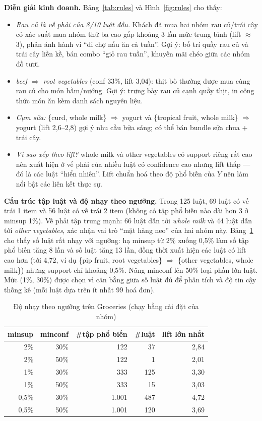 \documentclass[10pt,twocolumn,letterpaper]{article}
\begin{document}
\textbf{Diễn giải kinh doanh.} Bảng~\ref{tab:rules} và Hình~\ref{fig:rules} cho thấy:
\begin{itemize}
\item \emph{Rau củ là vế phải của 8/10 luật đầu.} Khách đã mua hai nhóm rau củ/trái cây có xác suất mua nhóm thứ ba cao gấp khoảng 3 lần mức trung bình (lift $\approx$ 3), phản ánh hành vi ``đi chợ nấu ăn cả tuần''. Gợi ý: bố trí quầy rau củ và trái cây liền kề, bán combo ``giỏ rau tuần'', khuyến mãi chéo giữa các nhóm đồ tươi.
\item \emph{beef $\Rightarrow$ root vegetables} (conf 33\%, lift 3,04): thịt bò thường được mua cùng rau củ cho món hầm/nướng. Gợi ý: trưng bày rau củ cạnh quầy thịt, in công thức món ăn kèm danh sách nguyên liệu.
\item \emph{Cụm sữa:} \{curd, whole milk\} $\Rightarrow$ yogurt và \{tropical fruit, whole milk\} $\Rightarrow$ yogurt (lift 2,6–2,8) gợi ý nhu cầu bữa sáng; có thể bán bundle sữa chua + trái cây.
\item \emph{Vì sao xếp theo lift?} whole milk và other vegetables có support riêng rất cao nên xuất hiện ở vế phải của nhiều luật có confidence cao nhưng lift thấp — đó là các luật ``hiển nhiên''. Lift chuẩn hoá theo độ phổ biến của $Y$ nên làm nổi bật các liên kết thực sự.
\end{itemize}
\textbf{Cấu trúc tập luật và độ nhạy theo ngưỡng.} Trong 125 luật, 69 luật có vế trái 1 item và 56 luật có vế trái 2 item (không có tập phổ biến nào dài hơn 3 ở minsup 1\%). Vế phải tập trung mạnh: 66 luật dẫn tới \textit{whole milk} và 44 luật dẫn tới \textit{other vegetables}, xác nhận vai trò ``mặt hàng neo'' của hai nhóm này. Bảng~\ref{tab:sens} cho thấy số luật rất nhạy với ngưỡng: hạ minsup từ 2\% xuống 0,5\% làm số tập phổ biến tăng 8 lần và số luật tăng 13 lần, đồng thời xuất hiện các luật có lift cao hơn (tới 4,72, ví dụ \{pip fruit, root vegetables\} $\Rightarrow$ \{other vegetables, whole milk\}) nhưng support chỉ khoảng 0,5\%. Nâng minconf lên 50\% loại phần lớn luật. Mức (1\%, 30\%) được chọn vì cân bằng giữa số luật đủ để phân tích và độ tin cậy thống kê (mỗi luật dựa trên ít nhất 99 hoá đơn).

\begin{table}[t]
\centering
\caption{Độ nhạy theo ngưỡng trên Groceries (chạy bằng cài đặt của nhóm)}
\label{tab:sens}
\footnotesize
\begin{tabular}{@{}rrrrr@{}}
\toprule
minsup & minconf & \#tập phổ biến & \#luật & lift lớn nhất \\ \midrule
2\% & 30\% & 122 & 37 & 2,84 \\
2\% & 50\% & 122 & 1 & 2,01 \\
1\% & 30\% & 333 & 125 & 3,30 \\
1\% & 50\% & 333 & 15 & 3,03 \\
0,5\% & 30\% & 1{.}001 & 487 & 4,72 \\
0,5\% & 50\% & 1{.}001 & 120 & 3,69 \\
\bottomrule
\end{tabular}
\end{table}
\end{document}
